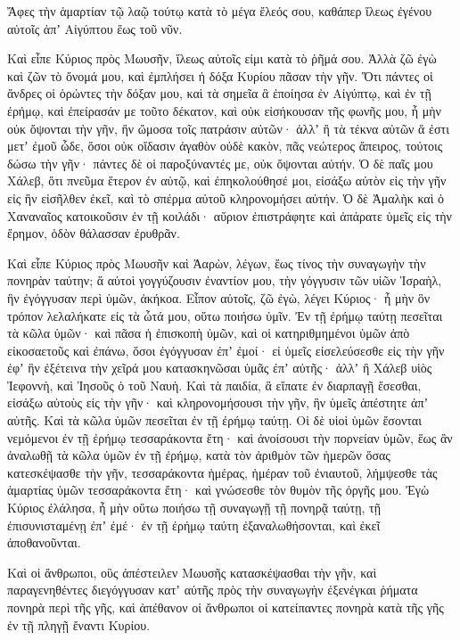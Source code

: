 {Ἄφες τὴν ἁμαρτίαν τῷ λαῷ τούτῳ κατὰ τὸ μέγα ἔλεός σου, καθάπερ ἵλεως ἐγένου αὐτοῖς ἀπʼ Αἰγύπτου ἕως τοῦ νῦν.
\par }{\PP {}Καὶ εἶπε Κύριος πρὸς Μωυσῆν, ἵλεως αὐτοῖς εἰμι κατὰ τὸ ῥῆμά σου.
Ἀλλὰ ζῶ ἐγὼ καὶ ζῶν τὸ ὄνομά μου, καὶ ἐμπλήσει ἡ δόξα Κυρίου πᾶσαν τὴν γῆν.
Ὅτι πάντες οἱ ἄνδρες οἱ ὁρώντες τὴν δόξαν μου, καὶ τὰ σημεῖα ἃ ἐποίησα ἐν Αἰγύπτῳ, καὶ ἐν τῇ ἐρήμῳ, καὶ ἐπείρασάν με τοῦτο δέκατον, καὶ οὐκ εἰσήκουσαν τῆς φωνῆς μου,
ἦ μὴν οὐκ ὄψονται τὴν γῆν, ἣν ὤμοσα τοῖς πατράσιν αὐτῶν· ἀλλʼ ἢ τὰ τέκνα αὐτῶν ἅ ἐστι μετʼ ἐμοῦ ὧδε, ὅσοι οὐκ οἴδασιν ἀγαθὸν οὐδὲ κακὸν, πᾶς νεώτερος ἄπειρος, τούτοις δώσω τὴν γῆν· πάντες δὲ οἱ παροξύναντές με, οὐκ ὄψονται αὐτήν.
Ὁ δὲ παῖς μου Χάλεβ, ὅτι πνεῦμα ἕτερον ἐν αὐτῷ, καὶ ἐπηκολούθησέ μοι, εἰσάξω αὐτὸν εἰς τὴν γῆν εἰς ἣν εἰσῆλθεν ἐκεῖ, καὶ τὸ σπέρμα αὐτοῦ κληρονομήσει αὐτήν.
Ὁ δὲ Ἀμαλὴκ καὶ ὁ Χαναναῖος κατοικοῦσιν ἐν τῇ κοιλάδι· αὔριον ἐπιστράφητε καὶ ἀπάρατε ὑμεῖς εἰς τὴν ἔρημον, ὁδὸν θάλασσαν ἐρυθρᾶν.
\par }{\PP {}Καὶ εἶπε Κύριος πρὸς Μωυσῆν καὶ Ἀαρὼν, λέγων,
ἕως τίνος τὴν συναγωγὴν τὴν πονηρὰν ταύτην; ἅ αὐτοὶ γογγύζουσιν ἐναντίον μου, τὴν γόγγυσιν τῶν υἱῶν Ἰσραὴλ, ἣν ἐγόγγυσαν περὶ ὑμῶν, ἀκήκοα.
Εἶπον αὐτοῖς, ζῶ ἐγὼ, λέγει Κύριος· ἦ μὴν ὃν τρόπον λελαλήκατε εἰς τὰ ὦτά μου, οὕτω ποιήσω ὑμῖν.
Ἐν τῇ ἐρήμῳ ταύτῃ πεσεῖται τὰ κῶλα ὑμῶν· καὶ πᾶσα ἡ ἐπισκοπὴ ὑμῶν, καὶ οἱ κατηριθμημένοι ὑμῶν ἀπὸ εἰκοσαετοῦς καὶ ἐπάνω, ὅσοι ἐγόγγυσαν ἐπʼ ἐμοί·
εἰ ὑμεῖς εἰσελεύσεσθε εἰς τὴν γῆν ἐφʼ ἣν ἐξέτεινα τὴν χεῖρά μου κατασκηνῶσαι ὑμᾶς ἐπʼ αὐτῆς· ἀλλʼ ἢ Χάλεβ υἱὸς Ἰεφοννὴ, καὶ Ἰησοῦς ὁ τοῦ Ναυὴ.
Καὶ τὰ παιδία, ἃ εἴπατε ἐν διαρπαγῇ ἔσεσθαι, εἰσάξω αὐτοὺς εἰς τὴν γῆν· καὶ κληρονομήσουσι τὴν γῆν, ἣν ὑμεῖς ἁπέστητε ἀπʼ αὐτῆς.
Καὶ τὰ κῶλα ὑμῶν πεσεῖται ἐν τῇ ἐρήμῳ ταύτῃ.
Οἱ δὲ υἱοὶ ὑμῶν ἔσονται νεμόμενοι ἐν τῇ ἐρήμῳ τεσσαράκοντα ἔτη· καὶ ἀνοίσουσι τὴν πορνείαν ὑμῶν, ἕως ἂν ἀναλωθῇ τὰ κῶλα ὑμῶν ἐν τῇ ἐρήμῳ,
κατὰ τὸν ἀριθμὸν τῶν ἡμερῶν ὅσας κατεσκέψασθε τὴν γῆν, τεσσαράκοντα ἡμέρας, ἡμέραν τοῦ ἐνιαυτοῦ, λήμψεσθε τὰς ἁμαρτίας ὑμῶν τεσσαράκοντα ἔτη· καὶ γνώσεσθε τὸν θυμὸν τῆς ὀργῆς μου.
Ἐγὼ Κύριος ἐλάλησα, ἦ μὴν οὕτω ποιήσω τῇ συναγωγῇ τῇ πονηρᾷ ταύτῃ, τῇ ἐπισυνισταμένῃ ἐπʼ ἐμέ· ἐν τῇ ἐρήμῳ ταύτη ἐξαναλωθήσονται, καὶ ἐκεῖ ἀποθανοῦνται.
\par }{\PP {}Καὶ οἱ ἄνθρωποι, οὓς ἀπέστειλεν Μωυσῆς κατασκέψασθαι τὴν γῆν, καὶ παραγενηθέντες διεγόγγυσαν κατʼ αὐτῆς πρὸς τὴν συναγωγὴν ἐξενέγκαι ῥήματα πονηρὰ περὶ τῆς γῆς,
καὶ ἀπέθανον οἱ ἄνθρωποι οἱ κατείπαντες πονηρὰ κατὰ τῆς γῆς ἐν τῇ πληγῇ ἔναντι Κυρίου.
}
